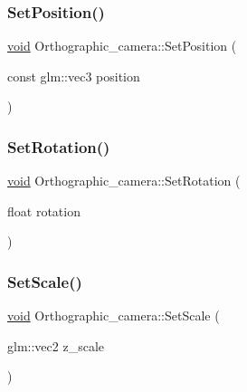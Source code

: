 \mbox{\label{classOrthographic__camera_a3cf573e0cc2b494bf6ca7adf11df8d0f}} 
\subsubsection{\texorpdfstring{Set\+Position()}{SetPosition()}}
{\footnotesize\ttfamily \hyperlink{imgui__impl__opengl3__loader_8h_ac668e7cffd9e2e9cfee428b9b2f34fa7}{void} Orthographic\+\_\+camera\+::\+Set\+Position (\begin{DoxyParamCaption}\item[{const glm\+::vec3}]{position }\end{DoxyParamCaption})\hspace{0.3cm}{\ttfamily [inline]}}

\mbox{\label{classOrthographic__camera_aafb33c86e3b3178dd76192e72306f1fb}} 
\subsubsection{\texorpdfstring{Set\+Rotation()}{SetRotation()}}
{\footnotesize\ttfamily \hyperlink{imgui__impl__opengl3__loader_8h_ac668e7cffd9e2e9cfee428b9b2f34fa7}{void} Orthographic\+\_\+camera\+::\+Set\+Rotation (\begin{DoxyParamCaption}\item[{float}]{rotation }\end{DoxyParamCaption})\hspace{0.3cm}{\ttfamily [inline]}}

\mbox{\label{classOrthographic__camera_ac3975aafe2fc108abf27a9df0068dd56}} 
\subsubsection{\texorpdfstring{Set\+Scale()}{SetScale()}}
{\footnotesize\ttfamily \hyperlink{imgui__impl__opengl3__loader_8h_ac668e7cffd9e2e9cfee428b9b2f34fa7}{void} Orthographic\+\_\+camera\+::\+Set\+Scale (\begin{DoxyParamCaption}\item[{glm\+::vec2}]{z\+\_\+scale }\end{DoxyParamCaption})\hspace{0.3cm}{\ttfamily [inline]}}



